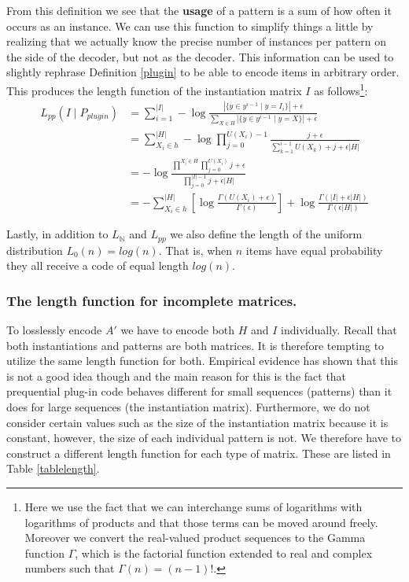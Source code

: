 \documentclass{llncs}
\begin{document}
From this definition we see that the \textbf{usage} of a pattern is a sum of how often it occurs as an instance. We can use this function to simplify things a little by realizing that we actually know the precise number of instances per pattern on the side of the decoder, but not as the decoder. This information can be used to slightly rephrase Definition \ref{plugin} to be able to encode items in arbitrary order. This produces the length function of the instantiation matrix ${I}$ as follows\footnote{Here we use the fact that we can interchange sums of logarithms with logarithms of products and that those terms can be moved around freely. Moreover we convert the real-valued product sequences to the Gamma function $\Gamma$, which is the factorial function extended to real and complex numbers such that $\Gamma(n) = (n-1)!$.}:
\begin{align*}
	L_{pp}({I}\mid P_{plugin}) &= \sum^{|{I}|}_{i=1} -\log \frac{|\{y \in y^{i-1} \mid y = {I}_i\}| + \epsilon }{\sum_{X \in H}|\{y \in y^{i-1} \mid y = X\}| + \epsilon}\\
	&= \sum^{|H|}_{X_i \in h} -\log \prod^{U(X_i)-1}_{j=0} \frac{j+\epsilon}{\sum^{i-1}_{k=1} U(X_k)+j+\epsilon|H|} \\
	&= -\log \frac{\prod^{X_i\in H} \prod^{U(X_i)}_{j=0} j + \epsilon}{\prod^{|{I}|-1}_{j=0} j + \epsilon|H|} \\
	&= -\sum^{|H|}_{X_i \in h} \left[ \log \frac{\Gamma(U(X_i)+\epsilon)}{\Gamma(\epsilon)}\right] + \log \frac{\Gamma(|{I}| + \epsilon|H|)}{\Gamma(\epsilon|H|)}
\end{align*}

Lastly, in addition to $L_{\mathbb{N}}$ and $L_{pp}$ we also define the length of the uniform distribution $L_0(n)=log(n)$. That is, when $n$ items have equal probability they all receive a code of equal length $log(n)$.

\subsubsection{The length function for incomplete matrices.}

To losslessly encode $A'$ we have to encode both $H$ and ${I}$ individually. Recall that both instantiations and patterns are both matrices. It is therefore tempting to utilize the same length function for both. Empirical evidence has shown that this is not a good idea though and the main reason for this is the fact that prequential plug-in code behaves different for small sequences (patterns) than it does for large sequences (the instantiation matrix). Furthermore, we do not consider certain values such as the size of the instantiation matrix because it is constant, however, the size of each individual pattern is not. We therefore have to construct a different length function for each type of matrix. These are listed in Table \ref{tablelength}.
\end{document}
